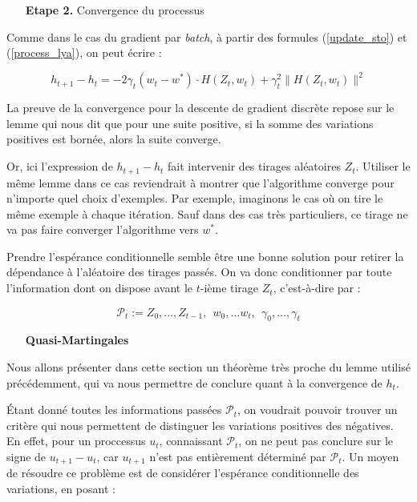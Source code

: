 \documentclass{article}
\begin{document}
\begin{itemize}
    \item[\textbf{Etape 2.}] Convergence du processus
\end{itemize}
\bigskip

Comme dans le cas du gradient par \emph{batch}, à partir des formules (\ref{update_sto}) et  (\ref{process_lya}), on peut écrire :

\begin{equation}\label{variations_sto}
    h_{t+1} - h_t = -2 \gamma_t(w_t-w^*) \cdot H(Z_t,w_t) + \gamma_t^2 \lVert H(Z_t,w_t) \rVert^2
\end{equation}

La preuve de la convergence pour la descente de gradient discrète repose sur le lemme qui nous dit que pour une suite positive, si la somme des variations positives est bornée, alors la suite converge.
\bigskip

Or, ici l'expression de $h_{t+1}-h_t$ fait intervenir des tirages aléatoires $Z_t$. Utiliser le même lemme dans ce cas reviendrait à montrer que l'algorithme converge pour n'importe quel choix d'exemples. Par exemple, imaginons le cas où on tire le même exemple à chaque itération. Sauf dans des cas très particuliers, ce tirage ne va pas faire  converger l'algorithme vers $w^*$. 
\bigskip

Prendre l'espérance conditionnelle semble être une bonne solution pour retirer la dépendance à l'aléatoire des tirages passés. On va donc conditionner par toute l'information dont on dispose avant le $t$-ième tirage $Z_t$, c'est-à-dire par :

\begin{equation*}
    \mathcal{P}_t:=Z_0,...,Z_{t-1},~~w_0,...w_t,~~\gamma_0,...,\gamma_t    
    \end{equation*}
    
\begin{itemize}
    \item[\textbf{Quasi-Martingales}]
\end{itemize}
\bigskip

Nous allons présenter dans cette section un théorème très proche du lemme utilisé précédemment, qui va nous permettre de conclure quant à la convergence de $h_t$.
\bigskip

Étant donné toutes les informations passées $\mathcal{P}_t$, on voudrait pouvoir trouver un critère qui nous permettent de distinguer les variations positives des négatives. En effet, pour un proccessus $u_t$, connaissant $\mathcal{P}_t$, on ne peut pas conclure sur le signe de $u_{t+1} - u_t$, car $u_{t+1}$ n'est pas entièrement déterminé par $\mathcal{P}_t$.
Un moyen de résoudre ce problème est de considérer l'espérance conditionnelle des variations, en posant :
\end{document}
